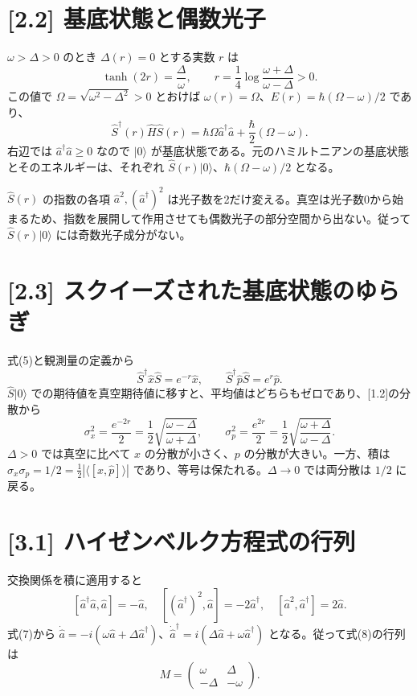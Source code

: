 \documentclass[11pt,a4paper]{article}
\begin{document}
\section*{[2.2] 基底状態と偶数光子}
$\omega>\Delta>0$ のとき $\Delta(r)=0$ とする実数 $r$ は
\[
\tanh(2r)=\frac{\Delta}{\omega},\qquad
\boxed{r=\frac14\log\frac{\omega+\Delta}{\omega-\Delta}}>0.
\]
この値で $\Omega=\sqrt{\omega^2-\Delta^2}>0$ とおけば $\omega(r)=\Omega$、$E(r)=\hbar(\Omega-\omega)/2$ であり、
\[
\hat S^\dagger(r)\hat H\hat S(r)
=\hbar\Omega\hat a^\dagger\hat a+\frac{\hbar}{2}(\Omega-\omega).
\]
右辺では $\hat a^\dagger\hat a\geq0$ なので $|0\rangle$ が基底状態である。元のハミルトニアンの基底状態とそのエネルギーは、それぞれ $\boxed{\hat S(r)|0\rangle}$、$\hbar(\Omega-\omega)/2$ となる。

$\hat S(r)$ の指数の各項 $\hat a^2,(\hat a^\dagger)^2$ は光子数を2だけ変える。真空は光子数0から始まるため、指数を展開して作用させても偶数光子の部分空間から出ない。従って $\hat S(r)|0\rangle$ には奇数光子成分がない。

\section*{[2.3] スクイーズされた基底状態のゆらぎ}
式(5)と観測量の定義から
\[
\hat S^\dagger\hat x\hat S=e^{-r}\hat x,
\qquad \hat S^\dagger\hat p\hat S=e^{r}\hat p.
\]
$\hat S|0\rangle$ での期待値を真空期待値に移すと、平均値はどちらもゼロであり、[1.2]の分散から
\[
\boxed{\sigma_x^2=\frac{e^{-2r}}2
=\frac12\sqrt{\frac{\omega-\Delta}{\omega+\Delta}}},
\qquad
\boxed{\sigma_p^2=\frac{e^{2r}}2
=\frac12\sqrt{\frac{\omega+\Delta}{\omega-\Delta}}}.
\]
$\Delta>0$ では真空に比べて $x$ の分散が小さく、$p$ の分散が大きい。一方、積は $\sigma_x\sigma_p=1/2=\frac12|\langle[\hat x,\hat p]\rangle|$ であり、等号は保たれる。$\Delta\to0$ では両分散は $1/2$ に戻る。

\section*{[3.1] ハイゼンベルク方程式の行列}
交換関係を積に適用すると
\[
[\hat a^\dagger\hat a,\hat a]=-\hat a,
\quad [(\hat a^\dagger)^2,\hat a]=-2\hat a^\dagger,
\quad [\hat a^2,\hat a^\dagger]=2\hat a.
\]
式(7)から $\dot{\hat a}=-i(\omega\hat a+\Delta\hat a^\dagger)$、$\dot{\hat a}^\dagger=i(\Delta\hat a+\omega\hat a^\dagger)$ となる。従って式(8)の行列は
\[
\boxed{M=\begin{pmatrix}\omega&\Delta\\-\Delta&-\omega\end{pmatrix}}.
\]
\end{document}
